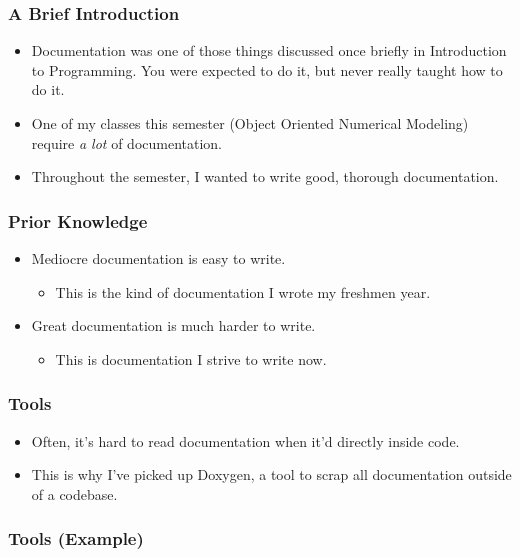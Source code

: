 \documentclass[xclolor=dvipsnames]{beamer}            %
\begin{document}
\begin{darkframes}
    \begin{frame}
        \frametitle{A Brief Introduction}

        \begin{itemize}
            \item Documentation was one of those things discussed once briefly in Introduction to Programming. You were expected to do it, but never really taught how to do it.
            \item One of my classes this semester (Object Oriented Numerical Modeling) require \textit{a lot} of documentation.
            \item Throughout the semester, I wanted to write good, thorough documentation.
        \end{itemize}
    \end{frame}

    \begin{frame}
        \frametitle{Prior Knowledge}

        \begin{itemize}
            \item Mediocre documentation is easy to write.
                \begin{itemize}
                    \item This is the kind of documentation I wrote my freshmen year.
                \end{itemize}

            \item Great documentation is much harder to write.
                \begin{itemize}
                    \item This is documentation I strive to write now.
                \end{itemize}
        \end{itemize}
    \end{frame}


    \begin{frame}
        \frametitle{Tools}
        \begin{itemize}
            \item Often, it's hard to read documentation when it'd directly inside code.
            \item This is why I've picked up Doxygen, a tool to scrap all documentation outside of a codebase.
        \end{itemize}
    \end{frame}

    \begin{frame}
        \frametitle{Tools (Example)}


\end{frame}
\end{darkframes}
\end{document}
